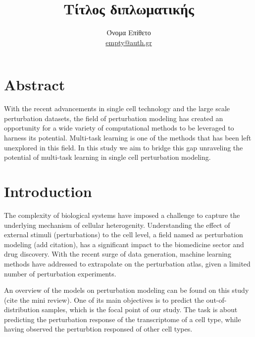 \documentclass[12pt, a4paper]{report}
\begin{document}


\title{Τίτλος διπλωματικής}
\author{Όνομα Επίθετο \\
\href{mailto:empty@auth.gr}{empty@auth.gr}}
\maketitle

{
\renewcommand*\contentsname{Περιεχόμενα}
\hypersetup{linkcolor=black}
\tableofcontents
}

\thispagestyle{empty}

\clearpage

\section{Abstract}

With the recent advancements in single cell technology and the large scale perturbation datasets, the field of perturbation modeling \cite{jiMachineLearningPerturbational2021} has created an opportunity for a wide variety of computational methods to be leveraged to harness its potential. Multi-task learning is one of the methods that has been left unexplored in this field. In this study we aim to bridge this gap unraveling the potential of multi-task learning in single cell perturbation modeling.


\section{Introduction}

The complexity of biological systems have imposed a challenge to capture the underlying mechanism of cellular heterogenity. Understanding the effect of external stimuli (perturbations) to the cell level, a field named as perturbation modeling (add citation), has a significant impact to the biomedicine sector and drug discovery. With the recent surge of data generation, machine learning methods have addressed to extrapolate on the perturbation atlas, given a limited number of perturbation experiments. 

An overview of the models on perturbation modeling can be found on this study (cite the mini review). One of its main objectives is to predict the out-of-distribution samples, which is the focal point of our study. The task is about predicting the perturbation response of the transcriptome of a cell type, while having observed the perturbtion responsed of other cell types.
\end{document}
